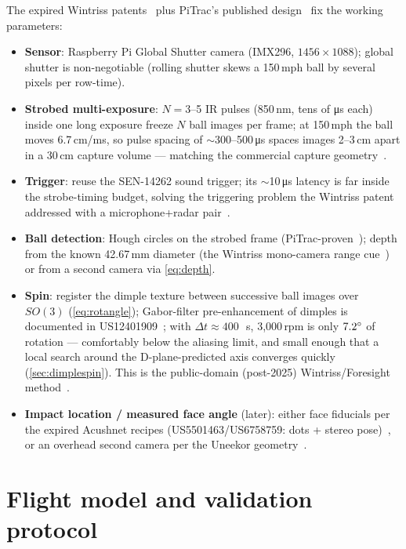 The expired Wintriss patents~\cite{us7292711} plus PiTrac's published
design~\cite{pitrac} fix the working parameters:
\begin{itemize}\itemsep2pt
\item \textbf{Sensor}: Raspberry Pi Global Shutter camera (IMX296,
$1456\times1088$); global shutter is non-negotiable (rolling shutter
skews a 150\,mph ball by several pixels per row-time).
\item \textbf{Strobed multi-exposure}: $N=3$--5 IR pulses
(850\,nm, tens of \si{\micro\second} each) inside one long exposure
freeze $N$ ball images per frame; at 150\,mph the ball moves 6.7\,cm/ms,
so pulse spacing of $\sim$300--500\,\si{\micro\second} spaces images
2--3\,cm apart in a 30\,cm capture volume --- matching the commercial
capture geometry~\cite{foresightgcquad,pitrac}.
\item \textbf{Trigger}: reuse the SEN-14262 sound trigger; its
$\sim$10\,\si{\micro\second} latency is far inside the strobe-timing
budget, solving the triggering problem the Wintriss patent addressed
with a microphone+radar pair~\cite{us7292711}.
\item \textbf{Ball detection}: Hough circles on the strobed frame
(PiTrac-proven~\cite{pitrac}); depth from the known 42.67\,mm diameter
(the Wintriss mono-camera range cue~\cite{us7292711}) or from a second
camera via \cref{eq:depth}.
\item \textbf{Spin}: register the dimple texture between successive
ball images over $SO(3)$ (\cref{eq:rotangle}); Gabor-filter
pre-enhancement of dimples is documented in
US12401909~\cite{us12401909}; with $\Delta t \approx 400$\,\si{\micro
\second}, 3,000\,rpm is only $7.2\si{\degree}$ of rotation --- comfortably
below the aliasing limit, and small enough that a local search around
the D-plane-predicted axis converges quickly
(\cref{sec:dimplespin}). This is the public-domain
(post-2025) Wintriss/Foresight method~\cite{us7292711,foresightspherical}.
\item \textbf{Impact location / measured face angle} (later): either
face fiducials per the expired Acushnet recipes
(US5501463/US6758759: dots + stereo pose)~\cite{us5501463,us6758759},
or an overhead second camera per the Uneekor
geometry~\cite{uneekoreyexo}.
\end{itemize}

\section{Flight model and validation protocol}


